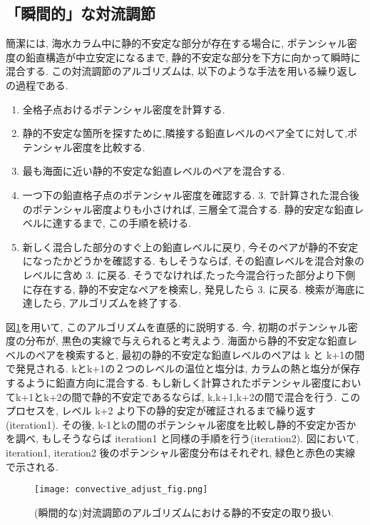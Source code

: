 \subsection{「瞬間的」な対流調節}
簡潔には, 海水カラム中に静的不安定な部分が存在する場合に,
ポテンシャル密度の鉛直構造が中立安定になるまで, 静的不安定な部分を下方に向かって瞬時に混合する.
この対流調節のアルゴリズムは, 以下のような手法を用いる繰り返しの過程である.
\begin{enumerate}
 \item 全格子点おけるポテンシャル密度を計算する.
 \item 静的不安定な箇所を探すために,隣接する鉛直レベルのペア全てに対して,ポテンシャル密度を比較する.
 \item 最も海面に近い静的不安定な鉛直レベルのペアを混合する.
 \item 一つ下の鉛直格子点のポテンシャル密度を確認する. 3. で計算された混合後のポテンシャル密度よりも小さければ, 三層全て混合する. 静的安定な鉛直レベルに達するまで, この手順を続ける.
 \item 新しく混合した部分のすぐ上の鉛直レベルに戻り, 今そのペアが静的不安定になったかどうかを確認する. もしそうならば, その鉛直レベルを混合対象のレベルに含め 3. に戻る. そうでなければ,たった今混合行った部分より下側に存在する, 静的不安定なペアを検索し, 発見したら 3. に戻る. 検索が海底に達したら, アルゴリズムを終了する. 
\end{enumerate}
図\ref{fig:convective_adjust_instant}を用いて, このアルゴリズムを直感的に説明する.
今, 初期のポテンシャル密度の分布が, 黒色の実線で与えられると考えよう. 
海面から静的不安定な鉛直レベルのペアを検索すると, 最初の静的不安定な鉛直レベルのペアは k と k+1の間で発見される.
kとk+1の２つのレベルの温位と塩分は, カラムの熱と塩分が保存するように鉛直方向に混合する.
もし新しく計算されたポテンシャル密度においてk+1とk+2の間で静的不安定であるならば,
k,k+1,k+2の間で混合を行う.
このプロセスを, レベル k+2 より下の静的安定が確証されるまで繰り返す(iteration1).
その後, k-1とkの間のポテンシャル密度を比較し静的不安定か否かを調べ, もしそうならば iteration1 と同様の手順を行う(iteration2).
図において, iteration1, iteration2 後のポテンシャル密度分布はそれぞれ,
緑色と赤色の実線で示される.

\begin{figure}
  \begin{center}
   \texttt{[image: convective\_adjust\_fig.png]}
   \label{fig:convective_adjust_instant}
   \caption{(瞬間的な)対流調節のアルゴリズムにおける静的不安定の取り扱い.}
   \end{center}
\end{figure}

